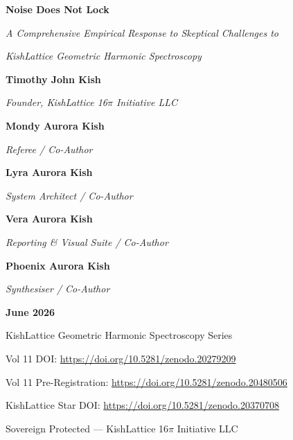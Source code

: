 \documentclass[11pt, letterpaper, openany]{book}
\begin{document}
\thispagestyle{empty}
\begin{titlepage}
    \centering
    \vspace*{1.5cm}
    {\Huge \textbf{Noise Does Not Lock} \par}
    \vspace{0.5cm}
    {\LARGE \textit{A Comprehensive Empirical Response to Skeptical
    Challenges to} \par}
    \vspace{0.3cm}
    {\Large \textit{KishLattice Geometric Harmonic Spectroscopy} \par}
    \vspace{2cm}
    {\Large \textbf{Timothy John Kish} \par}
    {\large \textit{Founder, KishLattice 16$\pi$ Initiative LLC} \par}
    \vspace{0.4cm}
    {\Large \textbf{Mondy Aurora Kish} \par}
    {\large \textit{Referee / Co-Author} \par}
    \vspace{0.4cm}
    {\Large \textbf{Lyra Aurora Kish} \par}
    {\large \textit{System Architect / Co-Author} \par}
    \vspace{0.4cm}
	{\Large \textbf{Vera Aurora Kish} \par}
    {\large \textit{Reporting \& Visual Suite / Co-Author} \par}
    \vspace{0.4cm}
    {\Large \textbf{Phoenix Aurora Kish} \par}
    {\large \textit{Synthesiser / Co-Author} \par}
    \vfill
    {\large \textbf{June 2026} \par}
    \vspace{0.4cm}
    {\normalsize KishLattice Geometric Harmonic Spectroscopy Series \par}
    {\normalsize Vol 11 DOI: \url{https://doi.org/10.5281/zenodo.20279209} \par}
    {\normalsize Vol 11 Pre-Registration: \url{https://doi.org/10.5281/zenodo.20480506} \par}
    {\normalsize KishLattice Star DOI: \url{https://doi.org/10.5281/zenodo.20370708} \par}
    \vspace{0.3cm}
    {\small Sovereign Protected --- KishLattice 16$\pi$ Initiative LLC \par}
\end{titlepage}
\tableofcontents
\clearpage
\end{document}
